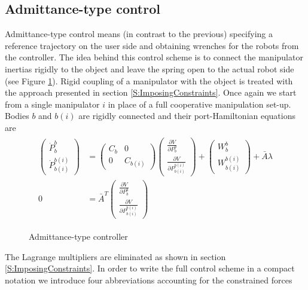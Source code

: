 \documentclass[a4paper,twoside, openright,12pt]{report}
\begin{document}
\subsection{Admittance-type control}
Admittance-type control means (in contrast to the previous) specifying a reference trajectory on the user side and obtaining wrenches for the robots from the controller. The idea behind this control scheme is to connect the manipulator inertias rigidly to the object and leave the spring open to the actual robot side (see Figure \ref{FIG:admittancecontrol}). Rigid coupling of a manipulator with the object is treated with the approach presented in section \ref{S:ImposingConstraints}. Once again we start from a single manipulator $i$ in place of a full cooperative manipulation set-up. Bodies $b$ and $b(i)$ are rigidly connected and their port-Hamiltonian equations are
\begin{eqnarray}
\begin{aligned}
\begin{pmatrix}
\dot{P}_b^b \\ \dot{P}_{b(i)}^{b(i)}
\end{pmatrix}
&=
\begin{pmatrix}
C_b & 0 \\ 0 & C_{b(i)} 
\end{pmatrix}
\begin{pmatrix} \frac{\partial V}{\partial P_b^b} \\ 
\frac{\partial V}{\partial P_{b(i)}^{b(i)}}
\end{pmatrix}
+
\begin{pmatrix}
W_b^b \\ W_{b(i)}^{b(i)}
\end{pmatrix}
+
\bar{A}\lambda 
\\
0 
&=
\bar{A}^T 
\begin{pmatrix} \frac{\partial V}{\partial P_b^b} \\ 
\frac{\partial V}{\partial P_{b(i)}^{b(i)}}
\end{pmatrix}
\end{aligned}
\end{eqnarray}
\begin{figure}[b!]
	\centering
	\sf\small
	\def\svgwidth{0.8\columnwidth}
	
	\caption{Admittance-type controller}
	\label{FIG:admittancecontrol}
\end{figure}
The Lagrange multipliers are eliminated as shown in section \ref{S:ImposingConstraints}. In order to write the full control scheme in a compact notation we introduce four abbreviations accounting for the constrained forces
\end{document}
